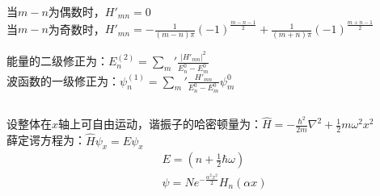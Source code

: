 当$m-n$为偶数时，$H'_{mn}=0$ \\

当$m-n$为奇数时，$\displaystyle H'_{mn} = -\frac{1}{(m-n)\pi}(-1)^{\frac{m-n-1}{2}}+\frac{1}{(m+n)\pi}(-1)^{\frac{m+n-1}{2}} $

能量的二级修正为：$\displaystyle E^{(2)}_{n}= \sum_{m}' \frac{\lvert H'_{mn}\rvert ^{2}}{E^0_{n}-E^0_{m}} $ \\

波函数的一级修正为：$\displaystyle \psi^{(1)}_{n}= \sum_{m}' \frac{H'_{mn}}{E^0_{n}-E^0_{m}} \psi^{0}_{m} $
\subsection{ }
设整体在$x$轴上可自由运动，谐振子的哈密顿量为：$\displaystyle \hat{H} = -\frac{\hbar^{2}}{2m} \nabla^{2}+\frac{1}{2}m\omega^{2}x^{2} $ \\

薛定谔方程为：$\hat{H}\psi_{x} = E\psi_{x}$ \\
\begin{equation}
\begin{aligned}
& E=(n+\frac{1}{2} \hbar \omega) \\
& \psi = Ne^{-\frac{\alpha^{2}x^{2}}{2}}H_{n}(\alpha x)
\end{aligned}
\end{equation}


